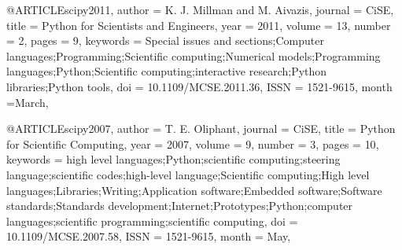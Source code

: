 
@ARTICLE{scipy2011,
   author = {K. J. {Millman} and M. {Aivazis}},
  journal = {CiSE},
    title = {Python for Scientists and Engineers},
     year = {2011},
   volume = {13},
   number = {2},
    pages = {9},
 keywords = {Special issues and sections;Computer languages;Programming;Scientific computing;Numerical models;Programming languages;Python;Scientific computing;interactive research;Python libraries;Python tools},
      doi = {10.1109/MCSE.2011.36},
     ISSN = {1521-9615},
    month ={March},
}

@ARTICLE{scipy2007,
   author = {T. E. {Oliphant}},
  journal = {CiSE},
    title = {Python for Scientific Computing},
     year = {2007},
   volume = {9},
   number = {3},
    pages = {10},
 keywords = {high level languages;Python;scientific computing;steering language;scientific codes;high-level language;Scientific computing;High level languages;Libraries;Writing;Application software;Embedded software;Software standards;Standards development;Internet;Prototypes;Python;computer languages;scientific programming;scientific computing},
      doi = {10.1109/MCSE.2007.58},
     ISSN = {1521-9615},
    month = {May},
}
